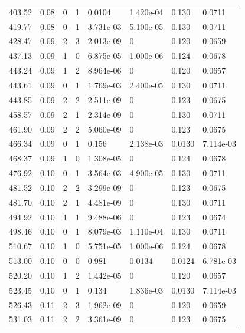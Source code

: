 \documentclass[preview]{standalone}
\begin{document}
{{{\begin{tabular}{L{1.2cm}C{1.2cm} C{0.3cm}C{0.5cm} C{1.4cm}C{1.4cm} C{1.4cm}C{1.4cm}}
  403.52  &  0.08  & 0     &  1 &  0.0104  & 1.420e-04  & 0.130 &  0.0711   \\ 
  419.77  &  0.08  & 0     &  1 &  3.731e-03  & 5.100e-05  & 0.130 &  0.0711   \\ 
  428.47  &  0.09  & 2     &  3 &  2.013e-09  & 0  & 0.120 &  0.0659   \\ 
  437.13  &  0.09  & 1     &  0 &  6.875e-05  & 1.000e-06  & 0.124 &  0.0678   \\ 
  443.24  &  0.09  & 1     &  2 &  8.964e-06  & 0  & 0.120 &  0.0657   \\ 
  443.61  &  0.09  & 0     &  1 &  1.769e-03  & 2.400e-05  & 0.130 &  0.0711   \\ 
  443.85  &  0.09  & 2     &  2 &  2.511e-09  & 0  & 0.123 &  0.0675   \\ 
  458.57  &  0.09  & 2     &  1 &  2.314e-09  & 0  & 0.130 &  0.0711   \\ 
  461.90  &  0.09  & 2     &  2 &  5.060e-09  & 0  & 0.123 &  0.0675   \\ 
  466.34  &  0.09  & 0     &  1 &  0.156  & 2.138e-03  & 0.0130 &  7.114e-03   \\ 
  468.37  &  0.09  & 1     &  0 &  1.308e-05  & 0  & 0.124 &  0.0678   \\ 
  476.92  &  0.10  & 0     &  1 &  3.564e-03  & 4.900e-05  & 0.130 &  0.0711   \\ 
  481.52  &  0.10  & 2     &  2 &  3.299e-09  & 0  & 0.123 &  0.0675   \\ 
  481.70  &  0.10  & 2     &  1 &  4.481e-09  & 0  & 0.130 &  0.0711   \\ 
  494.92  &  0.10  & 1     &  1 &  9.488e-06  & 0  & 0.123 &  0.0674   \\ 
  498.46  &  0.10  & 0     &  1 &  8.079e-03  & 1.110e-04  & 0.130 &  0.0711   \\ 
  510.67  &  0.10  & 1     &  0 &  5.751e-05  & 1.000e-06  & 0.124 &  0.0678   \\ 
  513.00  &  0.10  & 0     &  0 &  0.981  & 0.0134  & 0.0124 &  6.781e-03   \\ 
  520.20  &  0.10  & 1     &  2 &  1.442e-05  & 0  & 0.120 &  0.0657   \\ 
  523.45  &  0.10  & 0     &  1 &  0.134  & 1.836e-03  & 0.0130 &  7.114e-03   \\ 
  526.43  &  0.11  & 2     &  3 &  1.962e-09  & 0  & 0.120 &  0.0659   \\ 
  531.03  &  0.11  & 2     &  2 &  3.361e-09  & 0  & 0.123 &  0.0675   \\ 

\end{tabular}}}}
\end{document}
